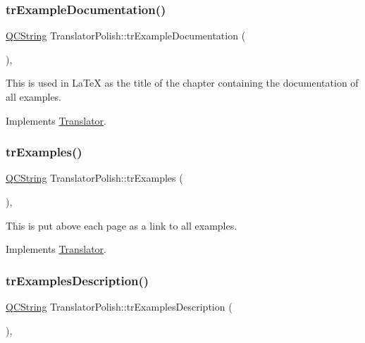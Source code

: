 \subsubsection{\texorpdfstring{trExampleDocumentation()}{trExampleDocumentation()}}
{\footnotesize\ttfamily \mbox{\hyperlink{class_q_c_string}{Q\+C\+String}} Translator\+Polish\+::tr\+Example\+Documentation (\begin{DoxyParamCaption}{ }\end{DoxyParamCaption})\hspace{0.3cm}{\ttfamily [inline]}, {\ttfamily [virtual]}}

This is used in La\+TeX as the title of the chapter containing the documentation of all examples. 

Implements \mbox{\hyperlink{class_translator}{Translator}}.

\mbox{\label{class_translator_polish_a3a9406c85bbeccb8e01f6ea4faa88d6e}} 
\subsubsection{\texorpdfstring{trExamples()}{trExamples()}}
{\footnotesize\ttfamily \mbox{\hyperlink{class_q_c_string}{Q\+C\+String}} Translator\+Polish\+::tr\+Examples (\begin{DoxyParamCaption}{ }\end{DoxyParamCaption})\hspace{0.3cm}{\ttfamily [inline]}, {\ttfamily [virtual]}}

This is put above each page as a link to all examples. 

Implements \mbox{\hyperlink{class_translator}{Translator}}.

\mbox{\label{class_translator_polish_ab08c9c6f8e611a0d42e6984531a7259c}} 
\subsubsection{\texorpdfstring{trExamplesDescription()}{trExamplesDescription()}}
{\footnotesize\ttfamily \mbox{\hyperlink{class_q_c_string}{Q\+C\+String}} Translator\+Polish\+::tr\+Examples\+Description (\begin{DoxyParamCaption}{ }\end{DoxyParamCaption})\hspace{0.3cm}{\ttfamily [inline]}, {\ttfamily [virtual]}}

